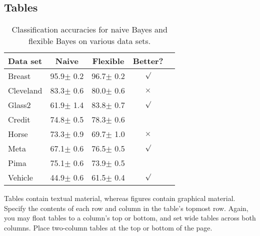 \documentclass{article}
\theoremstyle{plain}
\theoremstyle{definition}
\theoremstyle{remark}
\begin{document}
\subsection{Tables}


\begin{table}[t]
\caption{Classification accuracies for naive Bayes and flexible
Bayes on various data sets.}
\label{sample-table}
\vskip 0.15in
\begin{center}
\begin{small}
\begin{sc}
\begin{tabular}{lcccr}
\toprule
Data set & Naive & Flexible & Better? \\
\midrule
Breast    & 95.9$\pm$ 0.2& 96.7$\pm$ 0.2& $\surd$ \\
Cleveland & 83.3$\pm$ 0.6& 80.0$\pm$ 0.6& $\times$\\
Glass2    & 61.9$\pm$ 1.4& 83.8$\pm$ 0.7& $\surd$ \\
Credit    & 74.8$\pm$ 0.5& 78.3$\pm$ 0.6&         \\
Horse     & 73.3$\pm$ 0.9& 69.7$\pm$ 1.0& $\times$\\
Meta      & 67.1$\pm$ 0.6& 76.5$\pm$ 0.5& $\surd$ \\
Pima      & 75.1$\pm$ 0.6& 73.9$\pm$ 0.5&         \\
Vehicle   & 44.9$\pm$ 0.6& 61.5$\pm$ 0.4& $\surd$ \\
\bottomrule
\end{tabular}
\end{sc}
\end{small}
\end{center}
\vskip -0.1in
\end{table}

Tables contain textual material, whereas figures contain graphical material.
Specify the contents of each row and column in the table's topmost
row. Again, you may float tables to a column's top or bottom, and set
wide tables across both columns. Place two-column tables at the
top or bottom of the page.
\end{document}

